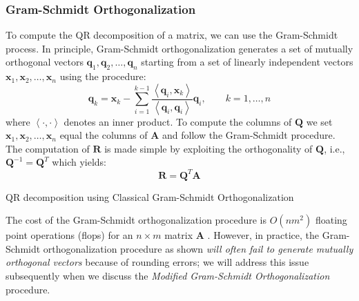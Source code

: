 \documentclass{article}[12pt]
\newcommand{\norm}[1]{\left|\left|#1\right|\right|}
\begin{document}
\subsubsection*{Gram-Schmidt Orthogonalization}
To compute the QR decomposition of a matrix, we can use the Gram-Schmidt process.
In principle, Gram-Schmidt orthogonalization generates a set of mutually orthogonal vectors $\mathbf{q}_{1},\mathbf{q}_{2},\hdots,
\mathbf{q}_{n}$ starting from a set of linearly independent vectors $\mathbf{x}_{1},\mathbf{x}_{2},\hdots,\mathbf{x}_{n}$ using the procedure:
\begin{equation}\label{eq-gschmidt}
\mathbf{q}_{k}=\mathbf{x}_{k}-\sum_{i=1}^{k-1}\frac{\left<\mathbf{q}_{i},\mathbf{x}_{k}\right>}{\left<\mathbf{q}_{i},\mathbf{q}_{i}\right>}\mathbf{q}_{i},
\qquad{k=1,\hdots,n}
\end{equation}where $\left<\cdot,\cdot\right>$ denotes an inner product. To compute the columns of $\mathbf{Q}$ we set 
$\mathbf{x}_{1},\mathbf{x}_{2},\hdots,\mathbf{x}_{n}$ equal the columns of $\mathbf{A}$ and follow the Gram-Schmidt procedure. The computation
of $\mathbf{R}$ is made simple by exploiting the orthogonality of $\mathbf{Q}$, i.e., $\mathbf{Q}^{-1}=\mathbf{Q}^{T}$ which yields:
\begin{equation}
\mathbf{R}=\mathbf{Q}^{T}\mathbf{A}
\end{equation}
\begin{algorithm}[H]
   \begin{algorithmic}[1]
   \caption{QR decomposition using Classical Gram-Schmidt Orthogonalization}
   \State{$\mathbf{Q}(:,1)\gets\mathbf{A}(:,1)/\norm{\mathbf{A}(:,1)}$}
      \EndFor
      \State{$\mathbf{Q}(:,k)\gets\mathbf{Q}(:,k)/\norm{\mathbf{Q}(:,k)}$}
   \EndFor

   \end{algorithmic}
\end{algorithm}
The cost of the Gram-Schmidt orthogonalization procedure is $O(nm^{2})$ floating point operations (flops) for an $n\times{m}$ matrix $\mathbf{A}$ \cite{golub13}.
However, in practice, the Gram-Schmidt orthogonalization procedure as shown \emph{will often fail to generate mutually orthogonal vectors} because of rounding errors; we will address
this issue subsequently when we discuss the \emph{Modified Gram-Schmidt Orthogonalization} procedure. 
\end{document}
